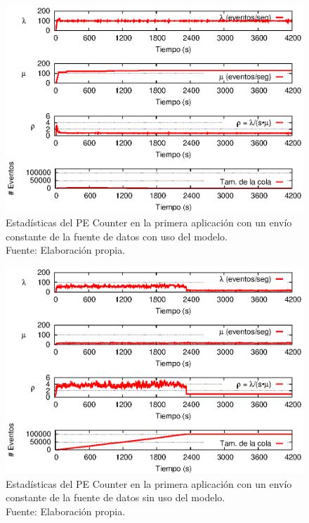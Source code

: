 \begin{figure}[!ht]
    \centering
    \captionsetup{justification=centering}
    \includegraphics[scale=1]{images/exp/app1/uniform/cm/statusCounterPE.eps}
    \caption[Estadísticas del PE Counter en la primera aplicación con un envío constante de la fuente de datos con uso del modelo.]{Estadísticas del PE Counter en la primera aplicación con un envío constante de la fuente de datos con uso del modelo.\\Fuente: Elaboración propia.}
    \label{fig:app1-uniform-statusCounterPE-cm}
\end{figure}

\begin{figure}[!ht]
    \centering
    \captionsetup{justification=centering}
    \includegraphics[scale=1]{images/exp/app1/uniform/sm/statusCounterPE.eps}
    \caption[Estadísticas del PE Counter en la primera aplicación con un envío constante de la fuente de datos sin uso del modelo.]{Estadísticas del PE Counter en la primera aplicación con un envío constante de la fuente de datos sin uso del modelo.\\Fuente: Elaboración propia.}
    \label{fig:app1-uniform-statusCounterPE-sm}
\end{figure}

